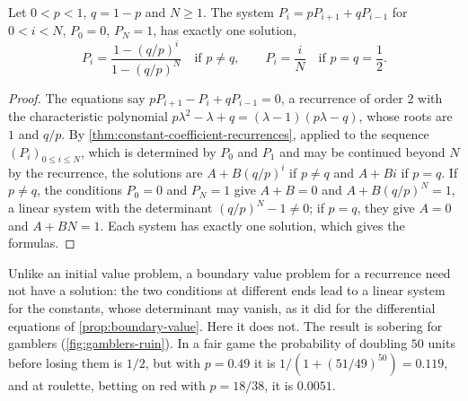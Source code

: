 \begin{proposition}
\label{prop:gamblers-ruin}
Let $0<p<1$, $q=1-p$ and $N\ge1$. The system $P_i=pP_{i+1}+qP_{i-1}$ for $0<i<N$, $P_0=0$, $P_N=1$, has exactly one solution,
\[
P_i=\frac{1-(q/p)^i}{1-(q/p)^N}\quad\text{if }p\ne q,\qquad P_i=\frac iN\quad\text{if }p=q=\frac12 .
\]
\end{proposition}

\begin{proof}
The equations say $pP_{i+1}-P_i+qP_{i-1}=0$, a recurrence of order $2$ with the characteristic polynomial $p\lambda^2-\lambda+q=(\lambda-1)(p\lambda-q)$, whose roots are $1$ and $q/p$. By \cref{thm:constant-coefficient-recurrences}, applied to the sequence $(P_{i})_{0\le i\le N}$, which is determined by $P_0$ and $P_1$ and may be continued beyond $N$ by the recurrence, the solutions are $A+B(q/p)^i$ if $p\ne q$ and $A+Bi$ if $p=q$. If $p\ne q$, the conditions $P_0=0$ and $P_N=1$ give $A+B=0$ and $A+B(q/p)^N=1$, a linear system with the determinant $(q/p)^N-1\ne0$; if $p=q$, they give $A=0$ and $A+BN=1$. Each system has exactly one solution, which gives the formulas.
\end{proof}

Unlike an initial value problem, a boundary value problem for a recurrence need not have a solution: the two conditions at different ends lead to a linear system for the constants, whose determinant may vanish, as it did for the differential equations of \cref{prop:boundary-value}. Here it does not. The result is sobering for gamblers (\cref{fig:gamblers-ruin}). In a fair game the probability of doubling $50$ units before losing them is $1/2$, but with $p=0.49$ it is $1/(1+(51/49)^{50})=0.119$, and at roulette, betting on red with $p=18/38$, it is $0.0051$.

\begin{figure}
\end{figure}

